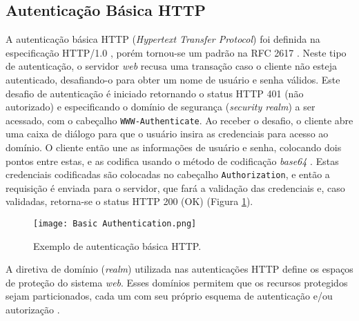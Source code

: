 \subsection{Autenticação Básica HTTP}

A autenticação básica HTTP (\emph{Hypertext Transfer Protocol}) foi definida na especificação
HTTP/1.0 \cite{RFC1945}, porém tornou-se um padrão na RFC 2617 \cite{RFC2617}. Neste tipo de
autenticação, o servidor \emph{web} recusa uma transação caso o cliente não esteja autenticado,
desafiando-o para obter um nome de usuário e senha válidos. Este desafio de autenticação é iniciado
retornando o status HTTP 401 (não autorizado) e especificando o domínio de segurança
(\emph{security realm}) a ser acessado, com o cabeçalho \texttt{WWW-Authenticate}. Ao receber o 
desafio, o cliente abre uma caixa de diálogo para que o usuário insira as credenciais para acesso 
ao domínio. O cliente então une as informações de usuário e senha, colocando dois pontos entre 
estas, e as codifica usando o método de codificação \emph{base64} \cite{rfc4648}. Estas credenciais codificadas são 
colocadas no cabeçalho \texttt{Authorization}, e então a requisição é enviada para o servidor, que 
fará a validação das credenciais e, caso validadas, retorna-se o status HTTP 200 (OK) 
\cite{GOURLEY2002} (Figura \ref{fig:basicAuth}).

\begin{figure}[ht] 
  \centering
  \texttt{[image: Basic Authentication.png]}
  \caption{Exemplo de autenticação básica HTTP.}
  \label{fig:basicAuth}
\end{figure}

A diretiva de domínio (\emph{realm}) utilizada nas autenticações HTTP define os espaços de proteção 
do sistema \emph{web}. Esses domínios permitem que os recursos protegidos sejam particionados, cada 
um com seu próprio esquema de autenticação e/ou autorização \cite{RFC2617}.